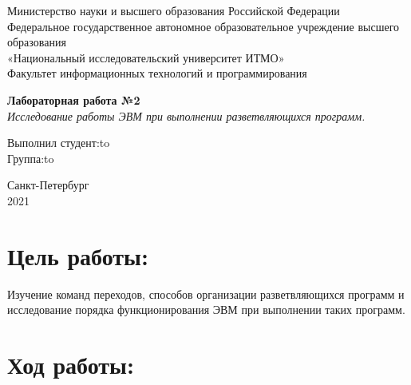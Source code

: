 \documentclass[a4paper,14pt]{article}
\begin{document}
\begin{titlepage}
\newpage

\begin{center}
Министерство науки и высшего образования Российской Федерации\\
Федеральное государственное автономное образовательное учреждение высшего образования\\
«Национальный исследовательский университет ИТМО»\\
Факультет информационных технологий и программирования\\
\end{center}

\vspace{\fill}

\begin{center}
\textbf{Лабораторная работа №2}\\
\textit{Исследование работы ЭВМ при выполнении разветвляющихся программ.}
\end{center}

\vspace{\fill}

\newbox{\lbox}
\newlength{\maxl}
\setlength{\maxl}{\wd\lbox}
\hfill\parbox{14cm}{
\hspace*{5cm}Выполнил студент:\hfill\hbox to\\
\hspace*{5cm}Группа:\hfill\hbox to\\
}


\vspace{8em}

\begin{center}
Санкт-Петербург \\2021
\end{center}

\end{titlepage}


\section*{Цель работы:}
Изучение команд переходов, способов организации
разветвляющихся программ и исследование порядка функционирования ЭВМ при
выполнении таких программ.
\section*{Ход работы:}
\end{document}
